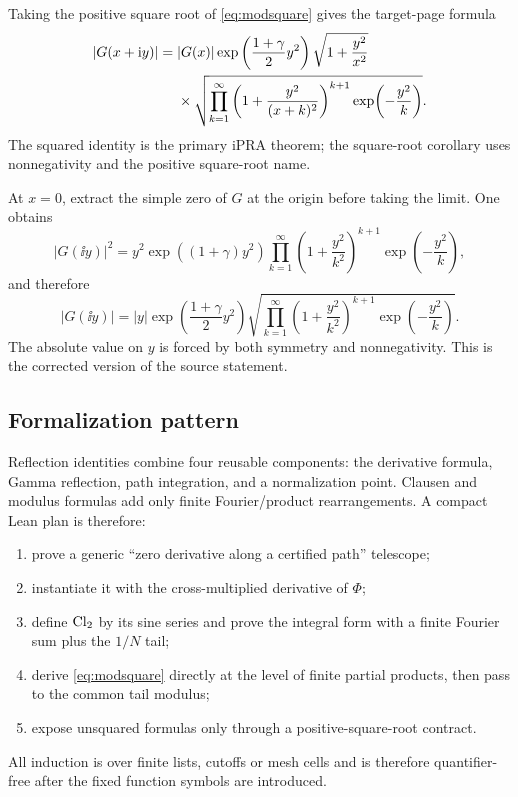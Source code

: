 Taking the positive square root of \cref{eq:modsquare} gives the target-page
formula
\begin{align}
 |G(x+\mathrm i y)|
 ={}&|G(x)|\exp\left(\frac{1+\gamma}{2}y^2\right)
 \sqrt{1+\frac{y^2}{x^2}}\notag\\
 &\times\sqrt{\prod_{k=1}^{\infty}
 \left(1+\frac{y^2}{(x+k)^2}\right)^{k+1}
 \exp\!\left(-\frac{y^2}{k}\right)}.
 \label{eq:modulus}
\end{align}
The squared identity is the primary iPRA theorem; the square-root corollary uses
nonnegativity and the positive square-root name.

At \(x=0\), extract the simple zero of \(G\) at the origin before taking the
limit.  One obtains
\begin{equation}\label{eq:pure-imag-square}
 |G(\ii y)|^2
 =y^2\exp((1+\gamma)y^2)
 \prod_{k=1}^{\infty}
 \left(1+\frac{y^2}{k^2}\right)^{k+1}
 \exp\!\left(-\frac{y^2}{k}\right),
\end{equation}
and therefore
\begin{equation}\label{eq:pure-imag}
 |G(\ii y)|
 =|y|\exp\left(\frac{1+\gamma}{2}y^2\right)
 \sqrt{\prod_{k=1}^{\infty}
 \left(1+\frac{y^2}{k^2}\right)^{k+1}
 \exp\!\left(-\frac{y^2}{k}\right)}.
\end{equation}
The absolute value on \(y\) is forced by both symmetry and nonnegativity.  This
is the corrected version of the source statement.

\subsection{Formalization pattern}

Reflection identities combine four reusable components: the derivative formula,
Gamma reflection, path integration, and a normalization point.  Clausen and
modulus formulas add only finite Fourier/product rearrangements.  A compact Lean
plan is therefore:

\begin{enumerate}
\item prove a generic ``zero derivative along a certified path'' telescope;
\item instantiate it with the cross-multiplied derivative of \(\Phi\);
\item define \(\operatorname{Cl}_2\) by its sine series and prove the integral form with a
finite Fourier sum plus the \(1/N\) tail;
\item derive \cref{eq:modsquare} directly at the level of finite partial
products, then pass to the common tail modulus;
\item expose unsquared formulas only through a positive-square-root contract.
\end{enumerate}

All induction is over finite lists, cutoffs or mesh cells and is therefore
quantifier-free after the fixed function symbols are introduced.
